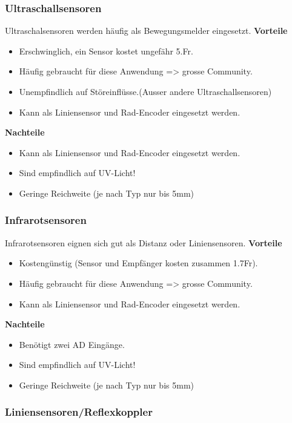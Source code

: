 \subsubsection{Ultraschallsensoren}
Ultraschalsensoren werden häufig als Bewegungsmelder eingesetzt. 
\textbf {Vorteile}
\begin{itemize}
\item Erschwinglich, ein Sensor kostet ungefähr 5.Fr.
\item Häufig gebraucht für diese Anwendung => grosse Community.
\item Unempfindlich auf Störeinflüsse.(Ausser andere Ultraschallsensoren)
\item Kann als Liniensensor und Rad-Encoder eingesetzt werden.\\
\end{itemize}
\textbf {Nachteile}
\begin{itemize}
\item Kann als Liniensensor und Rad-Encoder eingesetzt werden.\\
\item Sind empfindlich auf UV-Licht!
\item Geringe Reichweite (je nach Typ nur bis 5mm)
\end{itemize}
\subsubsection{Infrarotsensoren}
Infrarotsensoren eignen sich gut als Distanz oder Liniensensoren.
\textbf {Vorteile}
\begin{itemize}
\item Kostengünstig (Sensor und Empfänger kosten zusammen 1.7Fr).
\item Häufig gebraucht für diese Anwendung => grosse Community.\\
\item Kann als Liniensensor und Rad-Encoder eingesetzt werden.\\
\end{itemize}
\textbf {Nachteile}
\begin{itemize}
\item Benötigt zwei AD Eingänge.
\item Sind empfindlich auf UV-Licht!
\item Geringe Reichweite (je nach Typ nur bis 5mm)
\end{itemize}

\subsubsection{Liniensensoren/Reflexkoppler}

